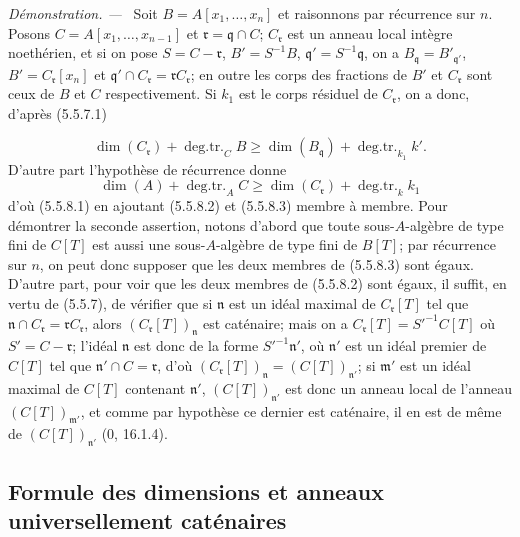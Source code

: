 \documentclass[10pt,oneside]{book}
\newcommand{\oldpage}[2][]{%
  \setcounter{footnote}{0}%
  \marginpar{\scriptsize\textbf{#1}~|~#2}\ignorespaces}
\newenvironment{proof}{%
  \par\medskip\noindent\textit{Démonstration. ---\ }}{\par}
\begin{document}
\begin{proof}
Soit $B=A[x_1,\ldots,x_n]$ et raisonnons par récurrence sur $n$. Posons
$C=A[x_1,\ldots,x_{n-1}]$ et $\mathfrak r=\mathfrak q\cap C$;
$C_{\mathfrak r}$ est un anneau local intègre noethérien, et si on pose
$S=C-\mathfrak r$, $B'=S^{-1}B$, $\mathfrak q'=S^{-1}\mathfrak q$, on a
$B_{\mathfrak q}=B'_{\mathfrak q'}$, $B'=C_{\mathfrak r}[x_n]$ et
$\mathfrak q'\cap C_{\mathfrak r}=\mathfrak rC_{\mathfrak r}$; en outre les
corps des fractions de $B'$ et $C_{\mathfrak r}$ sont ceux de $B$ et $C$
respectivement. Si $k_1$ est le corps résiduel de $C_{\mathfrak r}$, on a
donc, d'après (5.5.7.1)

\oldpage[IV-2]{97}

\begin{equation}
\dim(C_{\mathfrak r})+\operatorname{deg.tr.}_C B
\geq\dim(B_{\mathfrak q})+\operatorname{deg.tr.}_{k_1}k'.
\tag{5.5.8.2}\label{IV.2.s5.5.8.2-fr}
\end{equation}
D'autre part l'hypothèse de récurrence donne
\begin{equation}
\dim(A)+\operatorname{deg.tr.}_A C
\geq\dim(C_{\mathfrak r})+\operatorname{deg.tr.}_k k_1
\tag{5.5.8.3}\label{IV.2.s5.5.8.3-fr}
\end{equation}
d'où (5.5.8.1) en ajoutant (5.5.8.2) et (5.5.8.3) membre à membre. Pour
démontrer la seconde assertion, notons d'abord que toute sous-$A$-algèbre de
type fini de $C[T]$ est aussi une sous-$A$-algèbre de type fini de $B[T]$;
par récurrence sur $n$, on peut donc supposer que les deux membres de
(5.5.8.3) sont égaux. D'autre part, pour voir que les deux membres de
(5.5.8.2) sont égaux, il suffit, en vertu de (5.5.7), de vérifier que si
$\mathfrak n$ est un idéal maximal de $C_{\mathfrak r}[T]$ tel que
$\mathfrak n\cap C_{\mathfrak r}=\mathfrak rC_{\mathfrak r}$, alors
$(C_{\mathfrak r}[T])_{\mathfrak n}$ est caténaire; mais on a
$C_{\mathfrak r}[T]=S'^{-1}C[T]$ où $S'=C-\mathfrak r$; l'idéal
$\mathfrak n$ est donc de la forme $S'^{-1}\mathfrak n'$, où $\mathfrak n'$
est un idéal premier de $C[T]$ tel que $\mathfrak n'\cap C=\mathfrak r$,
d'où $(C_{\mathfrak r}[T])_{\mathfrak n}=(C[T])_{\mathfrak n'}$; si
$\mathfrak m'$ est un idéal maximal de $C[T]$ contenant $\mathfrak n'$,
$(C[T])_{\mathfrak n'}$ est donc un anneau local de l'anneau
$(C[T])_{\mathfrak m'}$, et comme par hypothèse ce dernier est caténaire, il
en est de même de $(C[T])_{\mathfrak n'}$ (0, 16.1.4).
\end{proof}

\subsection{Formule des dimensions et anneaux universellement caténaires}
\label{IV.2.s5.6-fr}
\end{document}
